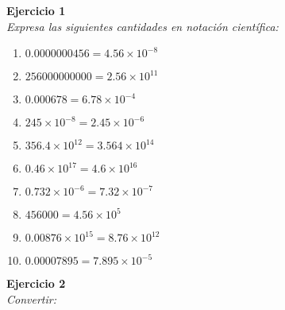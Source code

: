 \documentclass[letterpaper, 12pt, a4paper]{report}
\begin{document}
\begin{flushleft}
\textbf{Ejercicio 1}\\
\vspace{0.5cm}
\textit{Expresa las siguientes cantidades en notación científica:}
\vspace{0.5cm}
\begin{multicols}{2}
\begin{enumerate}
    \begin{enumerate}
        \item $0.0000000456 = 4.56 \times 10^{-8}$
\item $256000000000 = 2.56 \times 10^{11}$
\item $0.000678 = 6.78 \times 10^{-4}$
\item $245 \times 10^{-8} = 2.45 \times 10^{-6}$
\item $356.4 \times 10^{12} = 3.564 \times 10^{14}$
\columnbreak
\item $0.46 \times 10^{17} = 4.6 \times 10^{16}$
\item $0.732 \times 10^{-6} = 7.32 \times 10^{-7}$
\item $456000 = 4.56 \times 10^{5}$
\item $0.00876 \times 10^{15} = 8.76 \times 10^{12}$
\item $0.00007895 = 7.895 \times 10^{-5}$
\end{enumerate}
\end{enumerate}
\end{multicols}
\vspace{1cm}

\textbf{Ejercicio 2}\\
\vspace{0.5cm}
\textit{Convertir:}


\end{flushleft}
\end{document}
